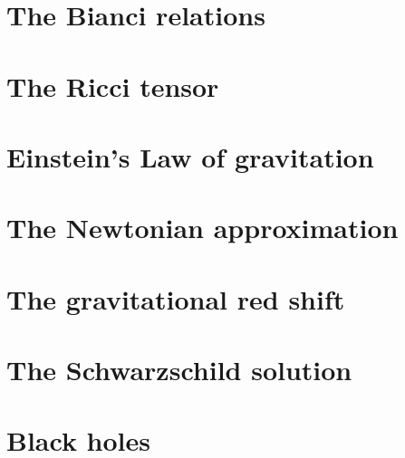 \documentclass[10pt]{article}
\numberwithin{equation}{section}
\begin{document}
\section{The Bianci relations}

\section{The Ricci tensor}

\section{Einstein's Law of gravitation}

\section{The Newtonian approximation}

\section{The gravitational red shift}

\section{The Schwarzschild solution}

\section{Black holes}

\end{document}
